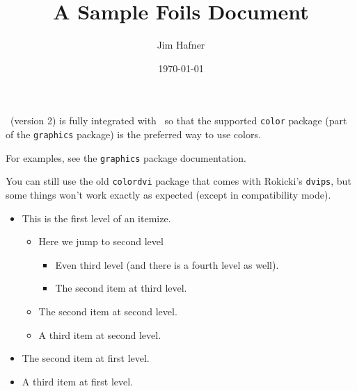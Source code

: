 \documentclass{beamer}
\title{A Sample Foils Document}
\author{Jim Hafner}
\institute{IBM Research Division\\
        Almaden Research Center\\
        \texttt{hafner@almaden.ibm.com}
        }
\date{\today}
\begin{document}
{}

\FoilTeX\ (version 2) is fully integrated with \LaTeXe\ so that the
supported \texttt{color} package (part of the \texttt{graphics}
package) is the preferred way to use colors.

For examples, see the \texttt{graphics} package documentation.

You can still use the old \texttt{colordvi} package that comes with
Rokicki's \texttt{dvips}, but some things won't work exactly as
expected (except in compatibility mode).

\LogoOff  %

\begin{itemize}
\item
This is the first level of an itemize.
  \begin{itemize}     %
  \item Here we jump to second level
     \begin{itemize}
     \item Even third level (and there is a fourth level as well).
     \item The second item at third level.
     \end{itemize}
  \item The second item at second level.
  \item A third item at second level.
  \end{itemize}
\item The second item at first level.
\item A third item at first level.
\end{itemize}
\end{document}
